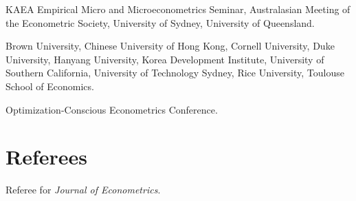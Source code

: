 \documentclass[10pt,letterpaper]{article}
\renewenvironment{itemize}{
  \begin{list}{}{
      \setlength{\leftmargin}{1.5em}
      \setlength{\itemsep}{0.25em}
      \setlength{\parskip}{0pt}
      \setlength{\parsep}{0.25em}
    }
}{
  \end{list}
}
\begin{document}
\begin{description}[font=\mdseries]
\item[2022]
  KAEA Empirical Micro and Microeconometrics Seminar,
  Australasian Meeting of the Econometric Society,
  University of Sydney,
  University of Queensland.
\item[2020]
  Brown University,
  Chinese University of Hong Kong,
  Cornell University,
  Duke University,
  Hanyang University,
  Korea Development Institute,
  University of Southern California,
  University of Technology Sydney,
  Rice University,
  Toulouse School of Economics.
\item[2019]
  Optimization-Conscious Econometrics Conference.
\end{description}

%

\section*{Referees}
\begin{itemize}
\item Referee for \textit{Journal of Econometrics}.
\end{itemize}
%
\end{document}
